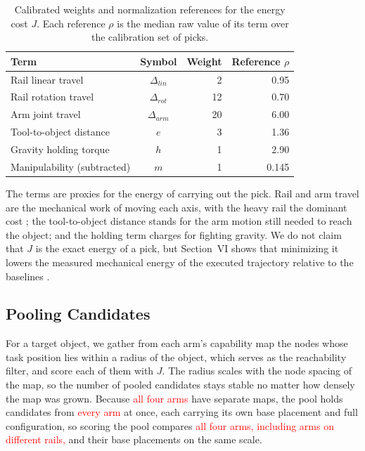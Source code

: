 \documentclass[conference]{IEEEtran}
\begin{document}
\begin{table}[htbp]
\caption{Calibrated weights and normalization references for the energy cost $J$.
Each reference $\rho$ is the median raw value of its term over the calibration set
of picks.}
\begin{center}
\begin{tabular}{|l|c|r|r|}
\hline
\textbf{Term} & \textbf{Symbol} & \textbf{Weight} & \textbf{Reference $\rho$} \\
\hline
Rail linear travel & $\Delta_{lin}$ & 2 & 0.95 \\
\hline
Rail rotation travel & $\Delta_{rot}$ & 12 & 0.70 \\
\hline
Arm joint travel & $\Delta_{arm}$ & 20 & 6.00 \\
\hline
Tool-to-object distance & $e$ & 3 & 1.36 \\
\hline
Gravity holding torque & $h$ & 1 & 2.90 \\
\hline
Manipulability (subtracted) & $m$ & 1 & 0.145 \\
\hline
\end{tabular}
\label{tab:weights}
\end{center}
\end{table}

The terms are proxies for the energy of carrying out the pick. Rail and arm travel
are the mechanical work of moving each axis, with the heavy rail the dominant cost
\cite{MoMaPos2024,BaSeNet2024}; the tool-to-object distance stands for the arm
motion still needed to reach the object; and the holding term charges for fighting
gravity. We do not claim that $J$ is the exact energy of a pick, but Section~VI
shows that minimizing it lowers the measured mechanical energy of the executed
trajectory relative to the baselines \cite{EnergySLR2024}.

\subsection{Pooling Candidates}

For a target object, we gather from each arm's capability map the nodes whose task
position lies within a radius of the object, which serves as the reachability
filter, and score each of them with $J$. The radius scales with the node spacing of
the map, so the number of pooled candidates stays stable no matter how densely the
map was grown. Because \textcolor{red}{all four arms} have separate maps, the pool holds candidates
from \textcolor{red}{every arm} at once, each carrying its own base placement and full
configuration, so scoring the pool compares \textcolor{red}{all four arms, including arms on different rails,} and their base placements
on the same scale.
\end{document}
